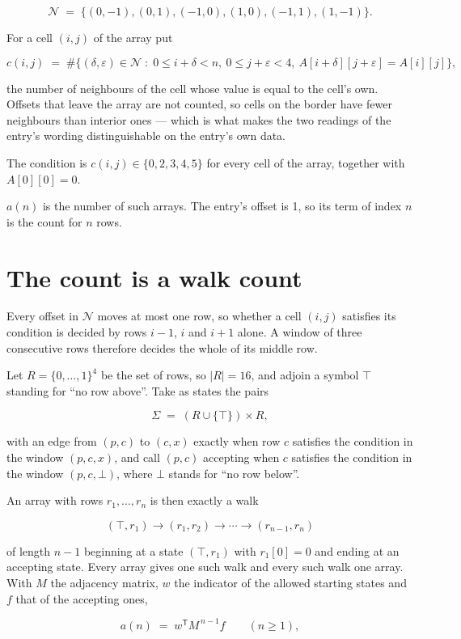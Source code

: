\documentclass[11pt]{article}
\theoremstyle{definition}
\begin{document}
\[\mathcal{N} \;=\; \{(0,-1), (0,1), (-1,0), (1,0), (-1,1), (1,-1)\}.\]

For a cell $(i,j)$ of the array put

\[c(i,j) \;=\; \#\bigl\{(\delta,\varepsilon)\in\mathcal{N} \;:\; 0\le i+\delta<n,\ 0\le j+\varepsilon<4,\ A[i+\delta][j+\varepsilon] = A[i][j]\bigr\},\]

the number of neighbours of the cell whose value is equal to the cell's own. Offsets that leave the array are not counted, so cells on the border have fewer neighbours than interior ones --- which is what makes the two readings of the entry's wording distinguishable on the entry's own data.

The condition is $c(i,j) \in \{0, 2, 3, 4, 5\}$ for every cell of the array, together with $A[0][0]=0$.

$a(n)$ is the number of such arrays. The entry's offset is 1, so its term of index $n$ is the count for $n$ rows.

\section{The count is a walk count}

Every offset in $\mathcal{N}$ moves at most one row, so whether a cell $(i,j)$ satisfies its condition is decided by rows $i-1$, $i$ and $i+1$ alone. A window of three consecutive rows therefore decides the whole of its middle row.

Let $R = \{0,\dots,1\}^{4}$ be the set of rows, so $|R| = 16$, and adjoin a symbol $\top$ standing for ``no row above''. Take as states the pairs

\[\Sigma \;=\; (R \cup \{\top\}) \times R,\]

with an edge from $(p,c)$ to $(c,x)$ exactly when row $c$ satisfies the condition in the window $(p,c,x)$, and call $(p,c)$ accepting when $c$ satisfies the condition in the window $(p,c,\bot)$, where $\bot$ stands for ``no row below''.

An array with rows $r_1,\dots,r_n$ is then exactly a walk

\[(\top,r_1) \to (r_1,r_2) \to \cdots \to (r_{n-1},r_n)\]

of length $n-1$ beginning at a state $(\top,r_1)$ with $r_1[0]=0$ and ending at an accepting state. Every array gives one such walk and every such walk one array. With $M$ the adjacency matrix, $w$ the indicator of the allowed starting states and $f$ that of the accepting ones,

\[a(n) \;=\; w^{\mathsf T} M^{\,n-1} f \qquad (n \ge 1),\]
\end{document}
